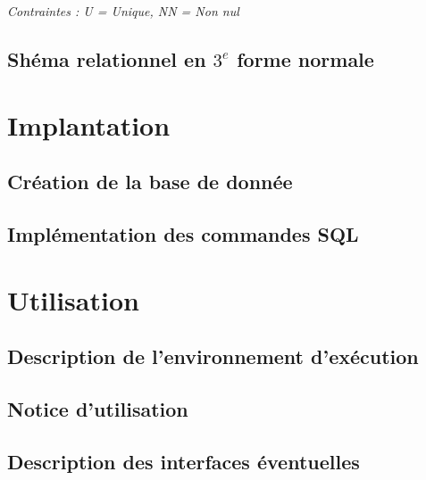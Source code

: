 \documentclass[a4paper,10.5pt]{article}
\begin{document}
\textit{Contraintes : U = Unique, NN = Non nul}

\subsection{Shéma relationnel en $3^e$ forme normale}

\section{Implantation}
\subsection{Création de la base de donnée}
\subsection{Implémentation des commandes SQL}

\section{Utilisation}
\subsection{Description de l'environnement d'exécution}
\subsection{Notice d'utilisation}
\subsection{Description des interfaces éventuelles}
\end{document}
